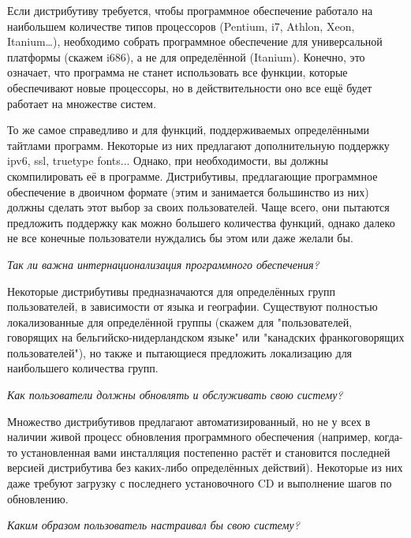 \documentclass[12pt]{book}
\begin{document}
Если дистрибутиву требуется, чтобы программное обеспечение работало на наибольшем количестве типов процессоров (Pentium, i7, Athlon, Xeon, Itanium\ldots), необходимо  собрать программное обеспечение для универсальной платформы (скажем i686), а не для определённой (Itanium). Конечно, это означает, что программа не станет использовать все функции, которые обеспечивают новые процессоры, но в действительности оно все ещё будет работает на множестве систем.

То же самое справедливо и для функций, поддерживаемых определёнными тайтлами программ. Некоторые из них предлагают дополнительную поддержку ipv6, ssl, truetype fonts... Однако, при необходимости,  вы должны скомпилировать её в программе. Дистрибутивы, предлагающие программное обеспечение в двоичном формате (этим и занимается большинство из них) должны сделать этот выбор за своих пользователей.  Чаще всего, они пытаются предложить поддержку как можно большего количества функций, однако далеко не все конечные пользователи нуждались бы этом или даже желали бы.

\begin{flushright}
{\color{gentoo}\emph{Так ли важна интернационализация программного обеспечения?}}
\end{flushright}

Некоторые дистрибутивы предназначаются для определённых групп пользователей, в зависимости от языка и географии. Существуют  полностью локализованные для определённой группы (скажем для "пользователей, говорящих на бельгийско-нидерландском языке" или "канадских франкоговорящих пользователей"), но также и пытающиеся предложить локализацию для наибольшего количества групп.

\begin{flushright}
{\color{gentoo}\emph{Как пользователи должны обновлять и обслуживать свою систему?}}
\end{flushright}

Множество дистрибутивов предлагают автоматизированный, но не у всех в наличии живой процесс обновления программного обеспечения (например, когда-то установленная вами инсталляция постепенно растёт и становится последней версией дистрибутива без каких-либо определённых действий). Некоторые из них даже требуют загрузку с последнего установочного CD и выполнение шагов по обновлению.

\begin{flushright}
{\color{gentoo}\emph{Каким образом пользователь настраивал бы свою систему?}}
\end{flushright}
\end{document}
